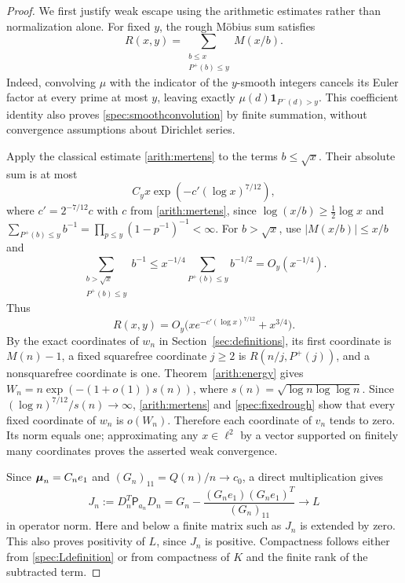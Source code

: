 \begin{proof}
We first justify weak escape using the arithmetic estimates rather than normalization alone. For fixed $y$, the rough M\"obius sum satisfies
\begin{equation}\label{spec:smoothconvolution}
 R(x,y)=\sum_{\substack{b\le x\\P^+(b)\le y}}M(x/b).
\end{equation}
Indeed, convolving $\mu$ with the indicator of the $y$-smooth integers cancels its Euler factor at every prime at most $y$, leaving exactly $\mu(d)\mathbf1_{P^-(d)>y}$. This coefficient identity also proves \eqref{spec:smoothconvolution} by finite summation, without convergence assumptions about Dirichlet series.

Apply the classical estimate \eqref{arith:mertens} to the terms $b\le\sqrt x$. Their absolute sum is at most
\[
 C_yx\exp(-c'(\log x)^{7/12}),
\]
where $c'=2^{-7/12}c$ with $c$ from \eqref{arith:mertens}, since $\log(x/b)\ge\frac12\log x$ and $\sum_{P^+(b)\le y}b^{-1}=\prod_{p\le y}(1-p^{-1})^{-1}<\infty$. For $b>\sqrt x$, use $|M(x/b)|\le x/b$ and
\[
 \sum_{\substack{b>\sqrt x\\P^+(b)\le y}}b^{-1}
 \le x^{-1/4}\sum_{P^+(b)\le y}b^{-1/2}=O_y(x^{-1/4}).
\]
Thus
\begin{equation}\label{spec:fixedrough}
 R(x,y)=O_y\bigl(xe^{-c'(\log x)^{7/12}}+x^{3/4}\bigr).
\end{equation}
By the exact coordinates of $w_n$ in Section~\ref{sec:definitions}, its first coordinate is $M(n)-1$, a fixed squarefree coordinate $j\ge2$ is $R(n/j,P^+(j))$, and a nonsquarefree coordinate is one. Theorem~\ref{arith:energy} gives
$W_n=n\exp(-(1+o(1))s(n))$, where $s(n)=\sqrt{\log n\log\log n}$.
Since $(\log n)^{7/12}/s(n)\to\infty$, \eqref{arith:mertens} and \eqref{spec:fixedrough} show that every fixed coordinate of $w_n$ is $o(W_n)$. Therefore each coordinate of $v_n$ tends to zero. Its norm equals one; approximating any $x\in\ell^2$ by a vector supported on finitely many coordinates proves the asserted weak convergence.

Since $\boldsymbol{\mu}_n=C_ne_1$ and $(G_n)_{11}=Q(n)/n\to c_0$, a direct multiplication gives
\begin{equation}\label{spec:Jdefinition}
 J_n:=D_n^T\mathsf P_{a_n}D_n
 =G_n-\frac{(G_ne_1)(G_ne_1)^T}{(G_n)_{11}}
 \longrightarrow L
\end{equation}
in operator norm. Here and below a finite matrix such as $J_n$ is extended by zero. This also proves positivity of $L$, since $J_n$ is positive. Compactness follows either from \eqref{spec:Ldefinition} or from compactness of $K$ and the finite rank of the subtracted term.


\end{proof}

